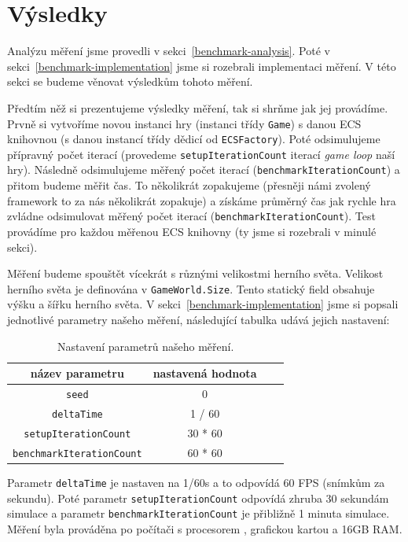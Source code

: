 \section{Výsledky}
\label{sec:benchmark-results}
Analýzu měření jsme provedli v sekci~\ref{benchmark-analysis}. Poté v sekci~\ref{benchmark-implementation} jsme si rozebrali implementaci měření. V této sekci se budeme věnovat výsledkům tohoto měření.

Předtím něž si prezentujeme výsledky měření, tak si shrňme jak jej provádíme. Prvně si vytvoříme novou instanci hry (instanci třídy \texttt{Game}) s danou ECS knihovnou (s danou instancí třídy dědicí od \texttt{ECSFactory}). Poté odsimulujeme přípravný počet iterací (provedeme \texttt{setupIterationCount} iterací \textit{game loop} naší hry). Následně odsimulujeme měřený počet iterací (\texttt{benchmarkIterationCount}) a přitom budeme měřit čas. To několikrát zopakujeme (přesněji námi zvolený framework to za nás několikrát zopakuje) a získáme průměrný čas jak rychle hra zvládne odsimulovat měřený počet iterací (\texttt{benchmarkIterationCount}). Test provádíme pro každou měřenou ECS knihovny (ty jsme si rozebrali v minulé sekci).

Měření budeme spouštět vícekrát s různými velikostmi herního světa. Velikost herního světa je definována v \texttt{GameWorld.Size}. Tento statický field obsahuje výšku a šířku herního světa. V sekci~\ref{benchmark-implementation} jsme si popsali jednotlivé parametry našeho měření, následující tabulka udává jejich nastavení:

\begin{table}[!htb]
    \centering\footnotesize\sf
    \begin{tabular}{c c c c}
        \toprule
        název parametru & nastavená hodnota \\
        \midrule
        \texttt{seed} & 0 \\
        \texttt{deltaTime} & 1 / 60 \\
        \texttt{setupIterationCount} & 30 * 60 \\
        \texttt{benchmarkIterationCount} & 60 * 60 \\
        \bottomrule
    \end{tabular}
    \caption{Nastavení parametrů našeho měření.}
    \label{tab:benchmark-parameters}
\end{table}

Parametr \texttt{deltaTime} je nastaven na 1/60s a to odpovídá 60 FPS (snímkům za sekundu). Poté parametr \texttt{setupIterationCount} odpovídá zhruba 30 sekundám simulace a parametr \texttt{benchmarkIterationCount} je přibližně 1 minuta simulace. Měření byla prováděna po počítači s procesorem , grafickou kartou  a 16GB RAM.


